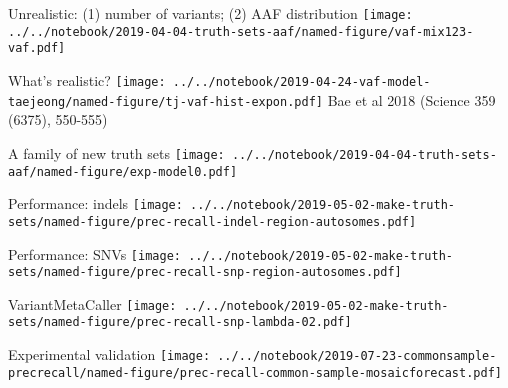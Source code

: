 \documentclass{beamer}
\begin{document}
\begin{frame}{Unrealistic: (1) number of variants; (2) AAF distribution}
\texttt{[image: ../../notebook/2019-04-04-truth-sets-aaf/named-figure/vaf-mix123-vaf.pdf]}
\end{frame}

\begin{frame}{What's realistic?}
\texttt{[image: ../../notebook/2019-04-24-vaf-model-taejeong/named-figure/tj-vaf-hist-expon.pdf]}
\tiny Bae et al 2018 (Science 359 (6375), 550-555)
\end{frame}

\begin{frame}{A family of new truth sets}
\texttt{[image: ../../notebook/2019-04-04-truth-sets-aaf/named-figure/exp-model0.pdf]}
\end{frame}


\begin{frame}{Performance: indels}
\texttt{[image: ../../notebook/2019-05-02-make-truth-sets/named-figure/prec-recall-indel-region-autosomes.pdf]}
\end{frame}

\begin{frame}{Performance: SNVs}
\texttt{[image: ../../notebook/2019-05-02-make-truth-sets/named-figure/prec-recall-snp-region-autosomes.pdf]}
\end{frame}

\begin{frame}[plain]{VariantMetaCaller}
\texttt{[image: ../../notebook/2019-05-02-make-truth-sets/named-figure/prec-recall-snp-lambda-02.pdf]}
\end{frame}


\begin{frame}{Experimental validation}
\texttt{[image: ../../notebook/2019-07-23-commonsample-precrecall/named-figure/prec-recall-common-sample-mosaicforecast.pdf]}
\end{frame}
\end{document}
